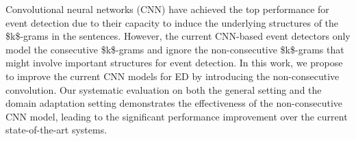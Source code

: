 Convolutional neural networks (CNN) have achieved the top performance for event detection due to their capacity to induce the underlying structures of the \$k\$-grams in the sentences. However, the current CNN-based event detectors only model the consecutive \$k\$-grams and ignore the non-consecutive \$k\$-grams that might involve important structures for event detection. In this work, we propose to improve the current CNN models for ED by introducing the non-consecutive convolution. Our systematic evaluation on both the general setting and the domain adaptation setting demonstrates the effectiveness of the non-consecutive CNN model, leading to the significant performance improvement over the current state-of-the-art systems.
